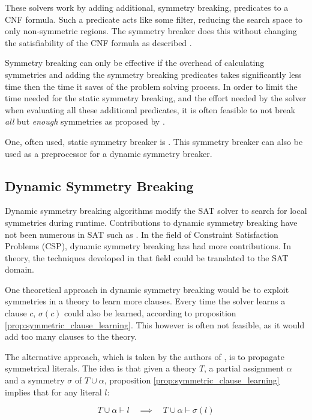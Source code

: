 	These solvers work by adding additional, symmetry breaking, predicates to a CNF 
	formula. Such a predicate acts like some filter, reducing the search space to only 
	non-symmetric regions. The symmetry breaker does this without changing the 
	satisfiability of the CNF formula as described \cite{aloul2003shatter}.

	Symmetry breaking can only be effective if the overhead of calculating symmetries and
	adding the symmetry breaking predicates takes significantly less time then the time it
	saves of the problem solving process. In order to limit the time needed for the static
	symmetry breaking, and the effort needed by the solver when evaluating all these
	additional predicates, it is often feasible to not break \emph{all} but \emph{enough} 
	symmetries as proposed by \cite{aloul2003shatter}.
	
	One, often used, static symmetry breaker is \cite{aloul2003shatter}. This symmetry
	breaker can also be used as a preprocessor for a dynamic symmetry breaker.

\subsection{Dynamic Symmetry Breaking}
	Dynamic symmetry breaking algorithms modify the SAT solver to search for local
	symmetries during runtime. Contributions to dynamic symmetry breaking have not been
	numerous in SAT such as \cite{sabharwal2005symchaff}. In the field of Constraint Satisfaction
	Problems (CSP), dynamic symmetry breaking has had more contributions.
	In theory, the techniques developed in that field could be translated to the SAT domain.

	One theoretical approach in dynamic symmetry breaking would be to exploit symmetries in
	a theory to learn more clauses.
	Every time the solver learns a clause $c$, $\sigma(c)$ could also be learned, according
	to proposition \ref{prop:symmetric_clause_learning}.
	This however is often not feasible, as it would add too many clauses to the theory.

	The alternative approach, which is taken by the authors of
	\cite{devriendt2012symmetry}, is to propagate symmetrical literals.
	The idea is that given a theory $T$, a partial assignment $\alpha$ and a symmetry
	$\sigma$ of $T \cup \alpha$, proposition \ref{prop:symmetric_clause_learning} implies
	that for any literal $l$:

	\begin{equation}
		T \cup \alpha \vdash l \quad
		\implies
		\quad T \cup \alpha \vdash \sigma(l)
	\end{equation}

